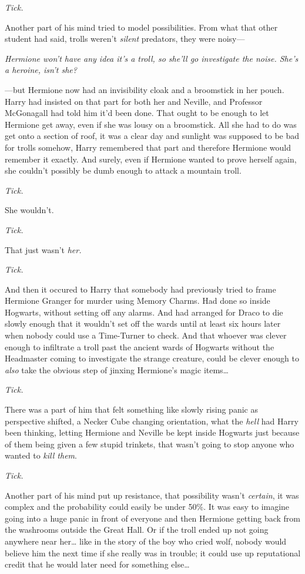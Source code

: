 \emph{Tick.}

Another part of his mind tried to model possibilities. From what that other 
student had said, trolls weren't \emph{silent} predators, they were noisy---

\emph{Hermione won't have any idea it's a troll, so she'll go investigate the 
noise. She's a heroine, isn't she?}

---but Hermione now had an invisibility cloak and a broomstick in her pouch. 
Harry had insisted on that part for both her and Neville, and Professor 
McGonagall had told him it'd been done. That ought to be enough to let Hermione 
get away, even if she was lousy on a broomstick. All she had to do was get onto 
a section of roof, it was a clear day and sunlight was supposed to be bad for 
trolls somehow, Harry remembered that part and therefore Hermione would 
remember it exactly. And surely, even if Hermione wanted to prove herself 
again, she couldn't possibly be dumb enough to attack a mountain troll.

\emph{Tick.}

She wouldn't.

\emph{Tick.}

That just wasn't \emph{her.}

\emph{Tick.}

And then it occured to Harry that somebody had previously tried to frame 
Hermione Granger for murder using Memory Charms. Had done so inside Hogwarts, 
without setting off any alarms. And had arranged for Draco to die slowly enough 
that it wouldn't set off the wards until at least six hours later when nobody 
could use a Time-Turner to check. And that whoever was clever enough to 
infiltrate a troll past the ancient wards of Hogwarts without the Headmaster 
coming to investigate the strange creature, could be clever enough to 
\emph{also} take the obvious step of jinxing Hermione's magic items{\ldots}

\emph{Tick.}

There was a part of him that felt something like slowly rising panic as 
perspective shifted, a Necker Cube changing orientation, what the \emph{hell} 
had Harry been thinking, letting Hermione and Neville be kept inside Hogwarts 
just because of them being given a few stupid trinkets, that wasn't going to 
stop anyone who wanted to \emph{kill them}.

\emph{Tick.}

Another part of his mind put up resistance, that possibility wasn't 
\emph{certain}, it was complex and the probability could easily be under 50\%. 
It was easy to imagine going into a huge panic in front of everyone and then 
Hermione getting back from the washrooms outside the Great Hall. Or if the 
troll ended up not going anywhere near her{\ldots} like in the story of the boy 
who cried wolf, nobody would believe him the next time if she really was in 
trouble; it could use up reputational credit that he would later need for 
something else{\ldots}


